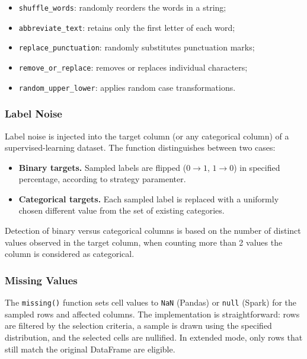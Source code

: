 \documentclass[../main.tex]{subfiles}
\begin{document}
\begin{itemize}
  \item \texttt{shuffle\_words}: randomly reorders the words in a string;
  \item \texttt{abbreviate\_text}: retains only the first letter of each
    word;
  \item \texttt{replace\_punctuation}: randomly substitutes punctuation
    marks;
  \item \texttt{remove\_or\_replace}: removes or replaces individual
    characters;
  \item \texttt{random\_upper\_lower}: applies random case transformations.
\end{itemize}

\subsubsection{Label Noise}\label{sec:labels}

Label noise is injected into the target column (or any categorical column) of a supervised-learning
dataset. The function distinguishes between two cases:

\begin{itemize}
  \item \textbf{Binary targets.}  Sampled labels are flipped
    ($0 \to 1$, $1 \to 0$) in specified percentage, according to strategy paramenter.
  \item \textbf{Categorical targets.}  Each sampled label is replaced
    with a uniformly chosen different value from the set of existing
    categories.
\end{itemize}

Detection of binary versus categorical columns is based on the number of
distinct values observed in the target column, when counting more than 2 values the column is considered as categorical.

\subsubsection{Missing Values}\label{sec:missing}

The \texttt{missing()} function sets cell values to \texttt{NaN} (Pandas)
or \texttt{null} (Spark) for the sampled rows and affected columns.  The
implementation is straightforward: rows are filtered by the selection
criteria, a sample is drawn using the specified distribution, and the
selected cells are nullified.  In extended mode, only rows that still
match the original DataFrame are eligible.
\end{document}
